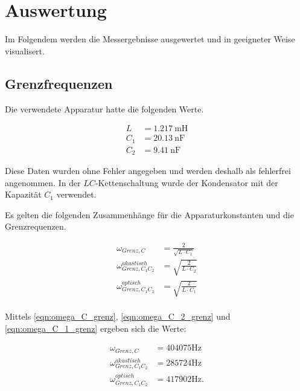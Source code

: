 %

%

\section{Auswertung}

Im Folgendem werden die Messergebnisse ausgewertet und in geeigneter
Weise visualisert.

\subsection{Grenzfrequenzen}

Die verwendete Apparatur hatte die folgenden Werte.

\begin{align}
  \label{L}
  L &= \SI{1,217}{\milli\henry}\\
  \label{C1}
  C_1 &= \SI{20,13}{\nano\farad}\\
  \label{C2}
  C_2 &= \SI{9,41}{\nano\farad}
\end{align}

Diese Daten wurden ohne Fehler angegeben und werden deshalb als fehlerfrei
angenommen. In der $LC$-Kettenschaltung wurde der Kondensator mit der
Kapazität $C_1$ verwendet.

Es gelten die folgenden Zusammenhänge für die Apparaturkonstanten und die
Grenzrequenzen.

\begin{align}
  \label{eqn:omega_C_grenz}
  \omega_{Grenz,C} &= \frac{2}{\sqrt{L\cdot C_1}} \\
  \label{eqn:omega_C_2_grenz}
  \omega_{Grenz,C_1C_2}^{akustisch} &= \sqrt{\frac{2}{L\cdot C_2}} \\
  \label{eqn:omega_C_1_grenz}
  \omega_{Grenz,C_1C_2}^{optisch} &= \sqrt{\frac{2}{L\cdot C_1}} \\
\end{align}

Mittels \eqref{eqn:omega_C_grenz}, \eqref{eqn:omega_C_2_grenz} und
\eqref{eqn:omega_C_1_grenz} ergeben sich die Werte:

\begin{align*}
  \omega_{Grenz,C} &= \num{404075}\si{\hertz}\\
  \omega_{Grenz,C_1C_2}^{akustisch} &= \num{285724}\si{\hertz}\\
  \omega_{Grenz,C_1C_2}^{optisch} &= \num{417902}\si{\hertz}.\\
\end{align*}

